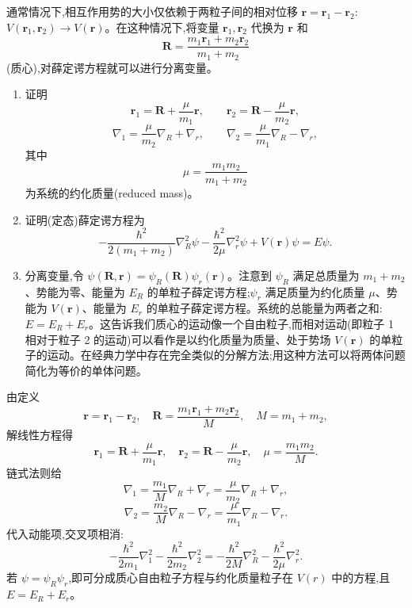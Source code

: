 \begin{question}
通常情况下,相互作用势的大小仅依赖于两粒子间的相对位移 $\mathbf r=\mathbf r_1-\mathbf r_2$:$V(\mathbf r_1,\mathbf r_2)\to V(\mathbf r)$。在这种情况下,将变量 $\mathbf r_1,\mathbf r_2$ 代换为 $\mathbf r$ 和
\[
\mathbf R=\frac{m_1\mathbf r_1+m_2\mathbf r_2}{m_1+m_2}
\]
(质心),对薛定谔方程就可以进行分离变量。
\begin{enumerate}
\item 证明
\[
\mathbf r_1=\mathbf R+\frac{\mu}{m_1}\mathbf r,\qquad
\mathbf r_2=\mathbf R-\frac{\mu}{m_2}\mathbf r,
\]
\[
\nabla_1=\frac{\mu}{m_2}\nabla_R+\nabla_r,\qquad
\nabla_2=\frac{\mu}{m_1}\nabla_R-\nabla_r,
\]
其中
\[
\mu=\frac{m_1m_2}{m_1+m_2}
\]
为系统的约化质量(reduced mass)。
\item 证明(定态)薛定谔方程为
\[
-\frac{\hbar^2}{2(m_1+m_2)}\nabla_R^2\psi
-\frac{\hbar^2}{2\mu}\nabla_r^2\psi+V(\mathbf r)\psi=E\psi.
\]
\item 分离变量,令 $\psi(\mathbf R,\mathbf r)=\psi_R(\mathbf R)\psi_r(\mathbf r)$。注意到 $\psi_R$ 满足总质量为 $m_1+m_2$、势能为零、能量为 $E_R$ 的单粒子薛定谔方程;$\psi_r$ 满足质量为约化质量 $\mu$、势能为 $V(\mathbf r)$、能量为 $E_r$ 的单粒子薛定谔方程。系统的总能量为两者之和:$E=E_R+E_r$。这告诉我们质心的运动像一个自由粒子,而相对运动(即粒子 1 相对于粒子 2 的运动)可以看作是以约化质量为质量、处于势场 $V(\mathbf r)$ 的单粒子的运动。在经典力学中存在完全类似的分解方法;用这种方法可以将两体问题简化为等价的单体问题。
\end{enumerate}
\end{question}
\begin{solution}

由定义
\[
\mathbf r=\mathbf r_1-\mathbf r_2,
\quad
\mathbf R=\frac{m_1\mathbf r_1+m_2\mathbf r_2}{M},\quad M=m_1+m_2,
\]
解线性方程得
\[
\mathbf r_1=\mathbf R+\frac{\mu}{m_1}\mathbf r,
\quad
\mathbf r_2=\mathbf R-\frac{\mu}{m_2}\mathbf r,
\quad \mu=\frac{m_1m_2}{M}.
\]
链式法则给
\[
\nabla_1=\frac{m_1}{M}\nabla_R+\nabla_r=\frac{\mu}{m_2}\nabla_R+\nabla_r,
\]
\[
\nabla_2=\frac{m_2}{M}\nabla_R-\nabla_r=\frac{\mu}{m_1}\nabla_R-\nabla_r.
\]
代入动能项,交叉项相消:
\[
-\frac{\hbar^2}{2m_1}\nabla_1^2-\frac{\hbar^2}{2m_2}\nabla_2^2
=-\frac{\hbar^2}{2M}\nabla_R^2-\frac{\hbar^2}{2\mu}\nabla_r^2.
\]
若 $\psi=\psi_R\psi_r$,即可分成质心自由粒子方程与约化质量粒子在 $V(r)$ 中的方程,且 $E=E_R+E_r$。

\end{solution}

